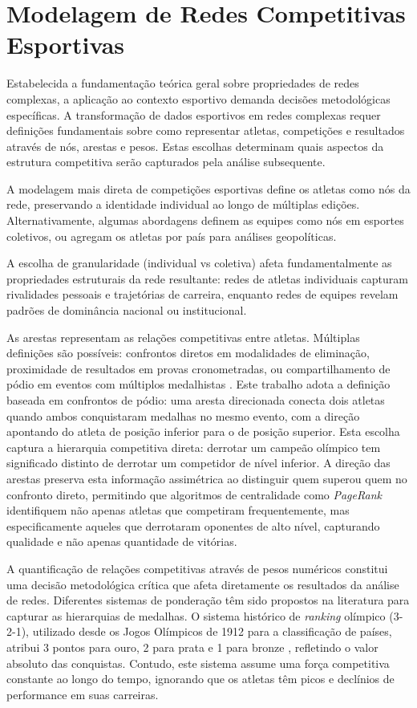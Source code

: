 \section{Modelagem de Redes Competitivas Esportivas}

Estabelecida a fundamentação teórica geral sobre propriedades de redes complexas, a aplicação ao contexto esportivo demanda decisões metodológicas específicas. A transformação de dados esportivos em redes complexas requer definições fundamentais sobre como representar atletas, competições e resultados através de nós, arestas e pesos. Estas escolhas determinam quais aspectos da estrutura competitiva serão capturados pela análise subsequente.

A modelagem mais direta de competições esportivas define os atletas como nós da rede, preservando a identidade individual ao longo de múltiplas edições. Alternativamente, algumas abordagens definem as equipes como nós em esportes coletivos, ou agregam os atletas por país para análises geopolíticas.

A escolha de granularidade (individual vs coletiva) afeta fundamentalmente as propriedades estruturais da rede resultante: redes de atletas individuais capturam rivalidades pessoais e trajetórias de carreira, enquanto redes de equipes revelam padrões de dominância nacional ou institucional.

As arestas representam as relações competitivas entre atletas. Múltiplas definições são possíveis: confrontos diretos em modalidades de eliminação, proximidade de resultados em provas cronometradas, ou compartilhamento de pódio em eventos com múltiplos medalhistas \cite{Radicchi2016OlympicDominance}. Este trabalho adota a definição baseada em confrontos de pódio: uma aresta direcionada conecta dois atletas quando ambos conquistaram medalhas no mesmo evento, com a direção apontando do atleta de posição inferior para o de posição superior. Esta escolha captura a hierarquia competitiva direta: derrotar um campeão olímpico tem significado distinto de derrotar um competidor de nível inferior. A direção das arestas preserva esta informação assimétrica ao distinguir quem superou quem no confronto direto, permitindo que algoritmos de centralidade como \textit{PageRank}{} identifiquem não apenas atletas que competiram frequentemente, mas especificamente aqueles que derrotaram oponentes de alto nível, capturando qualidade e não apenas quantidade de vitórias.

A quantificação de relações competitivas através de pesos numéricos constitui uma decisão metodológica crítica que afeta diretamente os resultados da análise de redes. Diferentes sistemas de ponderação têm sido propostos na literatura para capturar as hierarquias de medalhas. O sistema histórico de \textit{ranking} olímpico (3-2-1), utilizado desde os Jogos Olímpicos de 1912 para a classificação de países, atribui 3 pontos para ouro, 2 para prata e 1 para bronze \cite{Motegi2012NetworkBased}, refletindo o valor absoluto das conquistas. Contudo, este sistema assume uma força competitiva constante ao longo do tempo, ignorando que os atletas têm picos e declínios de performance em suas carreiras.

